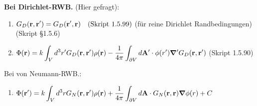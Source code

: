 \begin{enumerate}
        \textbf{Bei Dirichlet-RWB.} (Hier gefragt):
        \begin{center}
        \begin{enumerate}
          \item $\displaystyle G_D(\vb r, \vb r')= G_D(\vb r', \vb r)
            \quad\text{(Skript 1.5.99)}$ 
          (für reine Dirichlet Randbedingungen) (Skript §1.5.6)\\
        \item $\displaystyle \Phi(\vb r)=k\int_V d^3r' G_D(\vb r, \vb r')\rho(\vb r)
           -\frac{1}{4\pi}\int_{\partial V}d\vb A'\cdot\phi(r')
           \grad' G_D(\vb r, \vb r')$ (Skript 1.5.90)\\
        \end{enumerate}
        \end{center}
        Bei von Neumann-RWB.:
        \begin{enumerate}
          \item $\displaystyle \Phi(\vb r')=
            k\int_V d^3r G_N(\vb r,\vb r')\rho(\vb r)
            +\frac{1}{4\pi} \int_{\partial V} d\vb A \cdot 
            G_N(\vb r,\vb r)\grad\phi(r) + C$
        \end{enumerate}
\end{enumerate}
